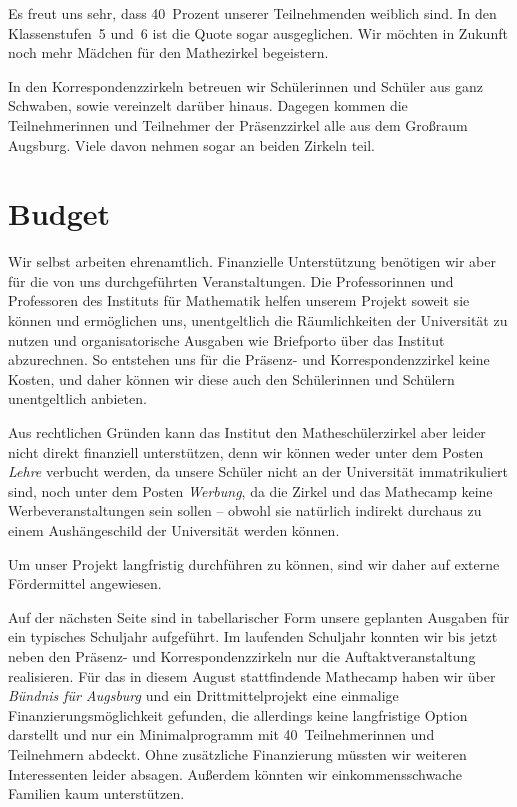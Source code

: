 \documentclass[12pt]{zettel}
\begin{document}
Es freut uns sehr, dass 40~Prozent unserer Teilnehmenden weiblich sind. In den Klassenstufen~5 und~6 ist die Quote sogar ausgeglichen. Wir möchten in Zukunft noch mehr Mädchen für den Mathezirkel begeistern.

In den Korrespondenzzirkeln betreuen wir Schülerinnen und Schüler aus ganz
Schwaben, sowie vereinzelt darüber hinaus. Dagegen kommen die Teilnehmerinnen
und Teilnehmer der Präsenzzirkel alle aus dem Großraum Augsburg. Viele davon
nehmen sogar an beiden Zirkeln teil.

\section{Budget}

Wir selbst arbeiten ehrenamtlich. Finanzielle Unterstützung benötigen wir aber
für die von uns durchgeführten Veranstaltungen. Die Professorinnen und
Professoren des Instituts für Mathematik helfen unserem Projekt soweit sie können
und ermöglichen uns, unentgeltlich die Räumlichkeiten der Universität zu nutzen
und organisatorische Ausgaben wie Briefporto über das Institut abzurechnen.
So entstehen uns für die Präsenz- und Korrespondenzzirkel keine Kosten, und
daher können wir diese auch den Schülerinnen und Schülern unentgeltlich
anbieten.

Aus rechtlichen Gründen kann das Institut den Matheschülerzirkel aber leider nicht
direkt finanziell unterstützen, denn wir können weder unter dem Posten
\emph{Lehre} verbucht werden, da unsere Schüler nicht an der Universität
immatrikuliert sind, noch unter dem Posten \emph{Werbung}, da die Zirkel und
das Mathecamp keine Werbeveranstaltungen sein sollen -- obwohl sie natürlich indirekt
durchaus zu einem Aushängeschild der Universität werden können.

Um unser Projekt langfristig durchführen zu können, sind wir daher auf externe
Fördermittel angewiesen.

Auf der nächsten Seite sind in tabellarischer Form unsere geplanten Ausgaben für ein
typisches Schuljahr aufgeführt. Im laufenden Schuljahr konnten wir bis jetzt
neben den Präsenz- und Korrespondenzzirkeln nur die Auftaktveranstaltung
realisieren. Für das in diesem August
stattfindende Mathecamp haben wir über \emph{Bündnis für Augsburg} und ein
Drittmittelprojekt eine einmalige Finanzierungsmöglichkeit gefunden, die
allerdings keine langfristige Option darstellt und nur ein Minimalprogramm mit 40~Teil\-neh\-me\-rin\-nen und Teilnehmern abdeckt. Ohne zusätzliche Finanzierung müssten wir weiteren
Interessenten leider absagen. Außerdem könnten wir einkommensschwache Familien
kaum unterstützen.
\end{document}
